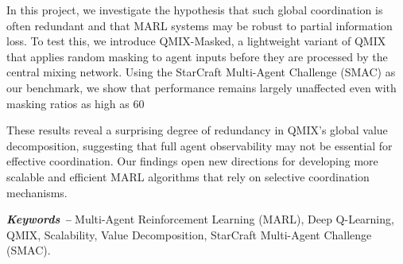 \documentclass[../Main.tex]{subfiles}
\begin{document}
In this project, we investigate the hypothesis that such global coordination is often redundant and that MARL systems may be robust to partial information loss. To test this, we introduce QMIX-Masked, a lightweight variant of QMIX that applies random masking to agent inputs before they are processed by the central mixing network. Using the StarCraft Multi-Agent Challenge (SMAC) as our benchmark, we show that performance remains largely unaffected even with masking ratios as high as 60%

These results reveal a surprising degree of redundancy in QMIX’s global value decomposition, suggesting that full agent observability may not be essential for effective coordination. Our findings open new directions for developing more scalable and efficient MARL algorithms that rely on selective coordination mechanisms.

\par\vspace*{\fill} %
\textbf{\textit{Keywords --}} Multi-Agent Reinforcement Learning (MARL), Deep Q-Learning, QMIX, Scalability, Value Decomposition, StarCraft Multi-Agent Challenge (SMAC). %

\biblio %
\end{document}
